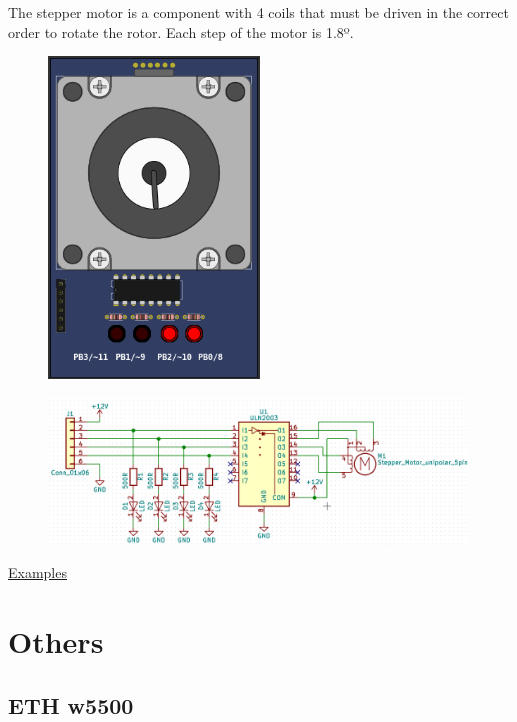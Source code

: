 The stepper motor is a component with 4 coils that must be driven in the correct order to rotate the rotor.
Each step of the motor is 1.8º.

\begin{figure}[H]
\center
\includegraphics[width=0.5\textwidth]{img/part_step.png} 
\end{figure} 

\begin{figure}[H]
\center
\includegraphics[width=0.99\textwidth]{img/part_step_.png} 
\end{figure} 

\href{https://lcgamboa.github.io/picsimlab_examples/parts_Step_Motor.html}{Examples}



\section{Others}


\subsection{ETH w5500}

